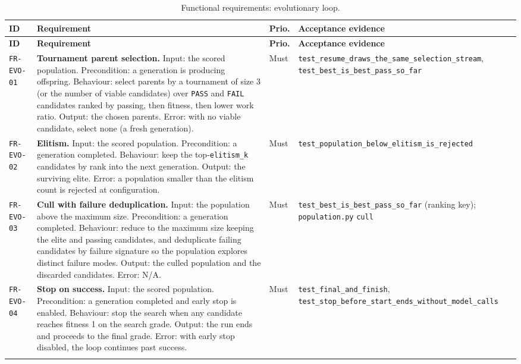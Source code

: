 \begin{longtable}{@{}>{\raggedright\arraybackslash}p{}>{\raggedright\arraybackslash}p{}p{}>{\raggedright\arraybackslash}p{}@{}}
\caption{Functional requirements: evolutionary loop.}\label{tab:fr-evo}\\
\toprule
\textbf{ID} & \textbf{Requirement} & \textbf{Prio.} & \textbf{Acceptance evidence} \\
\midrule
\endfirsthead
\toprule
\textbf{ID} & \textbf{Requirement} & \textbf{Prio.} & \textbf{Acceptance evidence} \\
\midrule
\endhead
\bottomrule
\endfoot

\texttt{FR-EVO-01} & \textbf{Tournament parent selection.} Input: the scored
population. Precondition: a generation is producing offspring. Behaviour: select
parents by a tournament of size 3 (or the number of viable candidates) over
\texttt{PASS} and \texttt{FAIL} candidates ranked by passing, then fitness, then
lower work ratio. Output: the chosen parents. Error: with no viable candidate,
select none (a fresh generation). & Must &
\texttt{test\_resume\_draws\_the\_same\_selection\_stream},
\texttt{test\_best\_is\_best\_pass\_so\_far} \\
\addlinespace[2pt]

\texttt{FR-EVO-02} & \textbf{Elitism.} Input: the scored population. Precondition:
a generation completed. Behaviour: keep the top-\texttt{elitism\_k} candidates by
rank into the next generation. Output: the surviving elite. Error: a population
smaller than the elitism count is rejected at configuration. & Must &
\texttt{test\_population\_below\_elitism\_is\_rejected} \\
\addlinespace[2pt]

\texttt{FR-EVO-03} & \textbf{Cull with failure deduplication.} Input: the
population above the maximum size. Precondition: a generation completed.
Behaviour: reduce to the maximum size keeping the elite and passing candidates,
and deduplicate failing candidates by failure signature so the population
explores distinct failure modes. Output: the culled population and the discarded
candidates. Error: N/A. & Must & \texttt{test\_best\_is\_best\_pass\_so\_far}
(ranking key); \texttt{population.py} \texttt{cull} \\
\addlinespace[2pt]

\texttt{FR-EVO-04} & \textbf{Stop on success.} Input: the scored population.
Precondition: a generation completed and early stop is enabled. Behaviour: stop
the search when any candidate reaches fitness 1 on the search grade. Output: the
run ends and proceeds to the final grade. Error: with early stop disabled, the
loop continues past success. & Must & \texttt{test\_final\_and\_finish},
\texttt{test\_stop\_before\_start\_ends\_without\_model\_calls} \\
\addlinespace[2pt]


\end{longtable}

